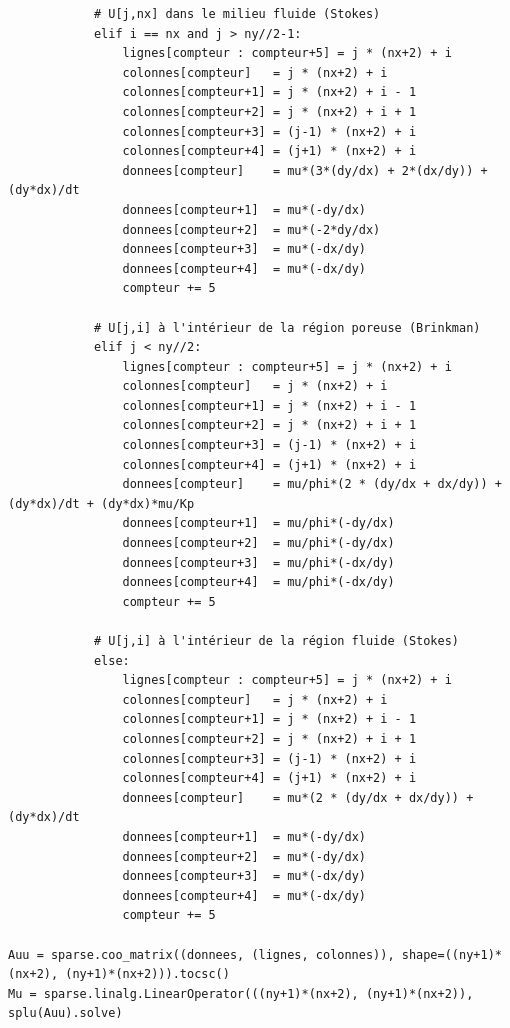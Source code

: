 \begin{verbatim}
            # U[j,nx] dans le milieu fluide (Stokes)
            elif i == nx and j > ny//2-1:
                lignes[compteur : compteur+5] = j * (nx+2) + i
                colonnes[compteur]   = j * (nx+2) + i
                colonnes[compteur+1] = j * (nx+2) + i - 1
                colonnes[compteur+2] = j * (nx+2) + i + 1
                colonnes[compteur+3] = (j-1) * (nx+2) + i
                colonnes[compteur+4] = (j+1) * (nx+2) + i
                donnees[compteur]    = mu*(3*(dy/dx) + 2*(dx/dy)) + (dy*dx)/dt
                donnees[compteur+1]  = mu*(-dy/dx)
                donnees[compteur+2]  = mu*(-2*dy/dx)
                donnees[compteur+3]  = mu*(-dx/dy)
                donnees[compteur+4]  = mu*(-dx/dy)
                compteur += 5
            
            # U[j,i] à l'intérieur de la région poreuse (Brinkman)
            elif j < ny//2:
                lignes[compteur : compteur+5] = j * (nx+2) + i
                colonnes[compteur]   = j * (nx+2) + i
                colonnes[compteur+1] = j * (nx+2) + i - 1
                colonnes[compteur+2] = j * (nx+2) + i + 1
                colonnes[compteur+3] = (j-1) * (nx+2) + i
                colonnes[compteur+4] = (j+1) * (nx+2) + i
                donnees[compteur]    = mu/phi*(2 * (dy/dx + dx/dy)) + (dy*dx)/dt + (dy*dx)*mu/Kp
                donnees[compteur+1]  = mu/phi*(-dy/dx)
                donnees[compteur+2]  = mu/phi*(-dy/dx)
                donnees[compteur+3]  = mu/phi*(-dx/dy)
                donnees[compteur+4]  = mu/phi*(-dx/dy)
                compteur += 5
        
            # U[j,i] à l'intérieur de la région fluide (Stokes)
            else:
                lignes[compteur : compteur+5] = j * (nx+2) + i
                colonnes[compteur]   = j * (nx+2) + i
                colonnes[compteur+1] = j * (nx+2) + i - 1
                colonnes[compteur+2] = j * (nx+2) + i + 1
                colonnes[compteur+3] = (j-1) * (nx+2) + i
                colonnes[compteur+4] = (j+1) * (nx+2) + i
                donnees[compteur]    = mu*(2 * (dy/dx + dx/dy)) + (dy*dx)/dt
                donnees[compteur+1]  = mu*(-dy/dx)
                donnees[compteur+2]  = mu*(-dy/dx)
                donnees[compteur+3]  = mu*(-dx/dy)
                donnees[compteur+4]  = mu*(-dx/dy)
                compteur += 5

Auu = sparse.coo_matrix((donnees, (lignes, colonnes)), shape=((ny+1)*(nx+2), (ny+1)*(nx+2))).tocsc()
Mu = sparse.linalg.LinearOperator(((ny+1)*(nx+2), (ny+1)*(nx+2)), splu(Auu).solve)
\end{verbatim}

